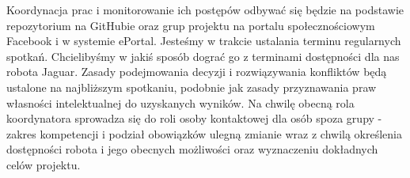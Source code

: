 Koordynacja prac i monitorowanie ich postępów odbywać się będzie na podstawie repozytorium na GitHubie oraz grup projektu na portalu społecznościowym Facebook i w systemie ePortal. Jesteśmy w trakcie ustalania terminu regularnych spotkań. Chcielibyśmy w jakiś sposób dograć go z terminami dostępności dla nas robota Jaguar. Zasady podejmowania decyzji i rozwiązywania konfliktów będą ustalone na najbliższym spotkaniu, podobnie jak zasady przyznawania praw własności intelektualnej do uzyskanych wyników. Na chwilę obecną rola koordynatora sprowadza się do roli osoby kontaktowej dla osób spoza grupy - zakres kompetencji i podział obowiązków ulegną zmianie wraz z chwilą określenia dostępności robota i jego obecnych możliwości oraz wyznaczeniu dokładnych celów projektu.
